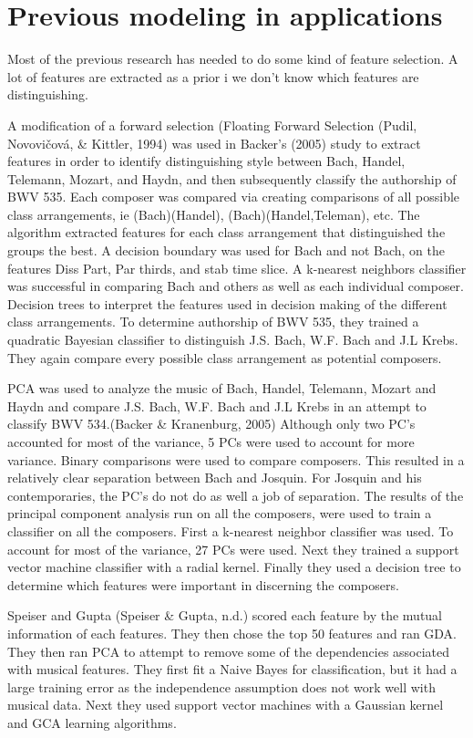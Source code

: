 \documentclass[12pt,twoside]{reedthesis}
\theoremstyle{definition}
\theoremstyle{definition}
\theoremstyle{definition}
\theoremstyle{remark}
\begin{document}
\section{Previous modeling in
applications}\label{previous-modeling-in-applications}

Most of the previous research has needed to do some kind of feature
selection. A lot of features are extracted as a prior i we don't know
which features are distinguishing.

A modification of a forward selection (Floating Forward Selection
(Pudil, Novovičová, \& Kittler, 1994) was used in Backer's (2005) study
to extract features in order to identify distinguishing style between
Bach, Handel, Telemann, Mozart, and Haydn, and then subsequently
classify the authorship of BWV 535. Each composer was compared via
creating comparisons of all possible class arrangements, ie
(Bach)(Handel), (Bach)(Handel,Teleman), etc. The algorithm extracted
features for each class arrangement that distinguished the groups the
best. A decision boundary was used for Bach and not Bach, on the
features Diss Part, Par thirds, and stab time slice. A k-nearest
neighbors classifier was successful in comparing Bach and others as well
as each individual composer. Decision trees to interpret the features
used in decision making of the different class arrangements. To
determine authorship of BWV 535, they trained a quadratic Bayesian
classifier to distinguish J.S. Bach, W.F. Bach and J.L Krebs. They again
compare every possible class arrangement as potential composers.

PCA was used to analyze the music of Bach, Handel, Telemann, Mozart and
Haydn and compare J.S. Bach, W.F. Bach and J.L Krebs in an attempt to
classify BWV 534.(Backer \& Kranenburg, 2005) Although only two PC's
accounted for most of the variance, 5 PCs were used to account for more
variance. Binary comparisons were used to compare composers. This
resulted in a relatively clear separation between Bach and Josquin. For
Josquin and his contemporaries, the PC's do not do as well a job of
separation. The results of the principal component analysis run on all
the composers, were used to train a classifier on all the composers.
First a k-nearest neighbor classifier was used. To account for most of
the variance, 27 PCs were used. Next they trained a support vector
machine classifier with a radial kernel. Finally they used a decision
tree to determine which features were important in discerning the
composers.

Speiser and Gupta (Speiser \& Gupta, n.d.) scored each feature by the
mutual information of each features. They then chose the top 50 features
and ran GDA. They then ran PCA to attempt to remove some of the
dependencies associated with musical features. They first fit a Naive
Bayes for classification, but it had a large training error as the
independence assumption does not work well with musical data. Next they
used support vector machines with a Gaussian kernel and GCA learning
algorithms.
\end{document}
